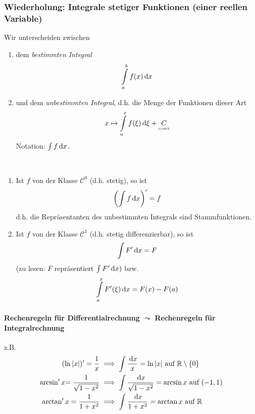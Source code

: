 \appendix
\newpage
\subsubsection*{Wiederholung: Integrale stetiger Funktionen (einer reellen Variable)} %
Wir unterscheiden zwischen
\begin{enumerate}[- ,topsep =-3pt]
	\item dem \emph{bestimmten Integral}
				$$ \int\limits_a^b f(x)\, \mathrm{d} x$$
	\item und dem \emph{unbestimmten Integral}, d.h. die Menge der Funktionen dieser Art
	$$x \mapsto \int\limits_a^x f(\xi) \, \mathrm{d} \xi + \underset{\text{\tiny const}}C$$
	Notation: $\int f \, \mathrm{d} x$.
\end{enumerate}

\begin{satz}  \begin{mdframed} \
\begin{enumerate}[(\roman*), topsep = -1 pt]
	\item Ist $f$ von der Klasse $\mathcal{C}^0$ (d.h. stetig), so ist 
		$$\left(\int f \, \mathrm{d} x\right)' = f$$
		d.h. die Repräsentanten des unbestimmten Integrals sind Stammfunktionen.
	\item Ist $f$ von der Klasse $\mathcal{C}^1$ (d.h. stetig differenzierbar), so ist
	$$ \int F' \, \mathrm{d} x =F$$
	(zu lesen: $F$ repräsentiert $\int F' \, \mathrm{d} x)$ bzw.
	$$ \int\limits_a^x F'(\xi) \, \mathrm{d} x = F(x) -F(a)$$
\end{enumerate}
\end{mdframed}
\end{satz}

\paragraph{Rechenregeln für Differentialrechnung $\leadsto$ Rechenregeln für Integralrechnung}z.B.
\begin{equation*}
	\begin{split}
		(\ln |x|)' = \frac{1}{x} & \implies \int \frac{\, \mathrm{d} x}{x} = \ln |x| \text{ auf } \mathbb{R}\setminus\{0\}\\
		\arcsin' x {=\frac{1}{\sqrt{1-x^2}}} & \implies \int \frac{\, \mathrm{d} x}{\sqrt{1-x^2}} = \arcsin x \text{ auf } (-1,1) \\ 		
		\arctan' x = \frac{1}{1+x^2} & \implies \int \frac{\, \mathrm{d} x}{1+x^2} = \arctan x \text{ auf }\mathbb{R}
	\end{split}
\end{equation*}
